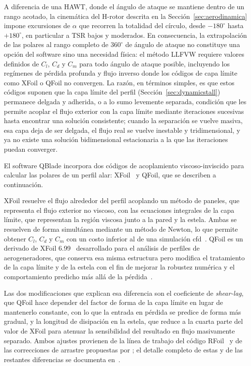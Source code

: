 A diferencia de una HAWT, donde el ángulo de ataque se mantiene dentro de un rango acotado, la cinemática del H-rotor descrita en la Sección~\ref{sec:aerodinamica} impone excursiones de $\alpha$ que recorren la totalidad del círculo, desde $-180^\circ$ hasta $+180^\circ$, en particular a TSR bajos y moderados. En consecuencia, la extrapolación de las polares al rango completo de $360^\circ$ de ángulo de ataque no constituye una opción del software sino una necesidad física: el método LLFVW requiere valores definidos de $C_l$, $C_d$ y $C_m$ para todo ángulo de ataque posible, incluyendo los regímenes de pérdida profunda y flujo inverso donde los códigos de capa límite como XFoil o QFoil no convergen. La razón, en términos simples, es que estos códigos suponen que la capa límite del perfil (Sección~\ref{sec:dynamicstall}) permanece delgada y adherida, o a lo sumo levemente separada, condición que les permite acoplar el flujo exterior con la capa límite mediante iteraciones sucesivas hasta encontrar una solución consistente; cuando la separación se vuelve masiva, esa capa deja de ser delgada, el flujo real se vuelve inestable y tridimensional, y ya no existe una solución bidimensional estacionaria a la que las iteraciones puedan converger.

El software QBlade incorpora dos códigos de acoplamiento viscoso-inviscido para calcular las polares de un perfil alar: XFoil~\parencite{drela1989xfoil} y QFoil, que se describen a continuación.

XFoil resuelve el flujo alrededor del perfil acoplando un método de paneles, que representa el flujo exterior no viscoso, con las ecuaciones integrales de la capa límite, que representan la región viscosa junto a la pared y la estela. Ambas se resuelven de forma simultánea mediante un método de Newton, lo que permite obtener $C_l$, $C_d$ y $C_m$ con un costo inferior al de una simulación \gls{cfd}~\parencite{drela1989xfoil}. QFoil es un derivado de XFoil 6.99~\parencite{drelaXfoil699} desarrollado para el análisis de perfiles de aerogeneradores, que conserva esa misma estructura pero modifica el tratamiento de la capa límite y de la estela con el fin de mejorar la robustez numérica y el comportamiento predicho más allá de la pérdida~\parencite{QBladeDocsQFoil2024}.

Las dos modificaciones que explican esa diferencia son el coeficiente de \textit{shear-lag}, que QFoil hace depender del factor de forma de la capa límite en lugar de mantenerlo constante, con lo que la entrada en pérdida se predice de forma más gradual, y la longitud de disipación en la estela, que reduce a la cuarta parte del valor de XFoil para atenuar la sensibilidad del resultado en flujo masivamente separado. Ambos ajustes provienen de la línea de trabajo del código RFoil~\parencite{VanRooij1996} y de las correcciones de arrastre propuestas por \textcite{Ramanujam2016}; el detalle completo de estas y de las restantes diferencias se documenta en~\parencite{QBladeDocsQFoil2024}.


